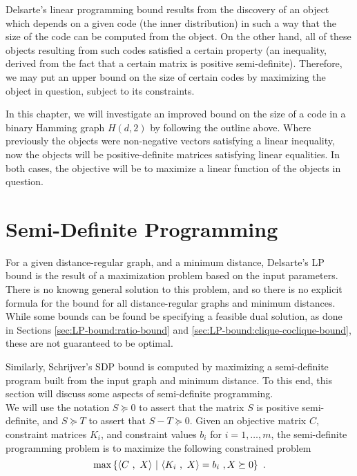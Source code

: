 \documentclass{report}
\begin{document}
  Delsarte's linear programming bound results from the discovery of an object
  which depends on a given code (the inner distribution) in such a way that the
  size of the code can be computed from the object.  On the other hand, all of
  these objects resulting from such codes satisfied a certain property (an
  inequality, derived from the fact that a certain matrix is positive
  semi-definite).  Therefore, we may put an upper bound on the size of certain
  codes by maximizing the object in question, subject to its constraints.

  In this chapter, we will investigate an improved bound on the size of a code
  in a binary Hamming graph $H(d, 2)$ by following the outline above.  Where
  previously the objects were non-negative vectors satisfying a linear
  inequality, now the objects will be positive-definite matrices satisfying
  linear equalities.  In both cases, the objective will be to maximize a linear
  function of the objects in question.

  \section{Semi-Definite Programming}\label{sec:SDP-bound:SDP}

    For a given distance-regular graph, and a minimum distance, Delsarte's LP
    bound is the result of a maximization problem based on the input parameters.
    There is no knowng general solution to this problem, and so there is no
    explicit formula for the bound for all distance-regular graphs and minimum
    distances.  While some bounds can be found be specifying a feasible dual
    solution, as done in Sections \ref{sec:LP-bound:ratio-bound} and
    \ref{sec:LP-bound:clique-coclique-bound}, these are not guaranteed to be
    optimal.

    Similarly, Schrijver's SDP bound is computed by maximizing a semi-definite
    program built from the input graph and minimum distance.  To this end, this
    section will discuss some aspects of semi-definite programming.
    \\

    We will use the notation $S \succeq 0$ to assert that the matrix $S$ is
    positive semi-definite, and $S \succeq T$ to assert that $S - T \succeq 0$.
    Given an objective matrix $C$, constraint matrices $K_i$, and constraint
    values $b_i$ for $i = 1, \ldots, m$, the semi-definite programming problem
    is to maximize the following constrained problem
    $$
      \max\left\lbrace  \left\langle  C \ , \ X  \right\rangle \ \middle| \ 
        \left\langle  K_i \ , \ X  \right\rangle = b_i \ ,
        X \succeq 0
        \right\rbrace \ .
    $$
\end{document}
